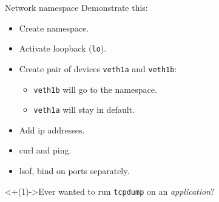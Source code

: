 \documentclass[14pt]{beamer}
\begin{document}
\begin{frame}{Network namespace}
    Demonstrate this:
    \begin{itemize}[<+(1)->]
        \item Create namespace.
        \item Activate loopback ({\tt lo}).
        \item Create pair of devices {\tt veth1a} and {\tt veth1b}:
            \begin{itemize}
                \item {\tt veth1b} will go to the namespace.
                \item {\tt veth1a} will stay in default.
            \end{itemize}
        \item Add ip addresses.
        \item curl and ping.
        \item lsof, bind on ports separately.
    \end{itemize}
    \onslide<+(1)->{\small Ever wanted to run {\tt tcpdump} on an {\em application}?}
\end{frame}
\end{document}
